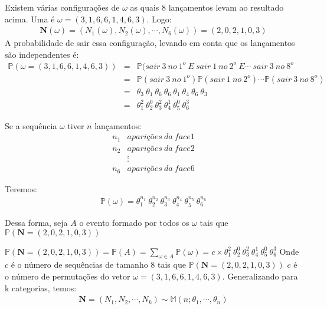 \documentclass[11pt,a4paper]{article}
\begin{document}
		Existem várias configurações de $\omega$ as quais 8 lançamentos levam ao resultado acima.
		Uma é $\omega=(3,1,6,6,1,4,6,3)$.
		Logo:
		\begin{align*}
			\textbf{N}(\omega)=(N_1(\omega),N_2(\omega),\cdots,N_6(\omega))=(2,0,2,1,0,3)
		\end{align*}
		A probabilidade de sair essa configuração, levando em conta que os lançamentos são independentes é:
		\begin{eqnarray*}
			\mathbb{P}(\omega=(3,1,6,6,1,4,6,3))&=&\mathbb{P}(sair~3~no~1^o~E~sair~1~no~2^o~E\cdots~sair~3~no~8^o\\
			& = &\mathbb{P}(sair~3~no~1^o)\mathbb{P}(sair~1~no~2^o)\cdots\mathbb{P}(sair~3~no~8^o)\\
			& = &\theta_3~\theta_1~\theta_6~\theta_6~\theta_1~\theta_4~\theta_6~\theta_3\\
			& = &\theta_{1}^{2}~\theta_{2}^{0}~\theta_{3}^{2}~\theta_{4}^{1}~\theta_{5}^{0}~\theta_{6}^{3}
		\end{eqnarray*}
		
		Se a sequência $\omega$ tiver $n$ lançamentos:
		\begin{eqnarray*}
			n_1 & aparições~da~face 1\\
			n_2 & aparições~da~face 2\\
			&\vdots\\
			n_6 & aparições~da~face 6
		\end{eqnarray*}
		
		Teremos:
		\begin{eqnarray*}
			\mathbb{P}(\omega)=\theta_{1}^{n_1}~\theta_{2}^{n_2}~\theta_{3}^{n_3}~\theta_{4}^{n_4}~\theta_{5}^{n_5}~\theta_{6}^{n_6}
		\end{eqnarray*}
		
		Dessa forma, seja $A$ o evento formado por todos os $\omega$ tais que $\mathbb{P}(\textbf{N}=(2,0,2,1,0,3))$
		
		$\mathbb{P}(\textbf{N}=(2,0,2,1,0,3))=\mathbb{P}(A)=\sum_{\omega\in A}\mathbb{P}(\omega)=c\times\theta_{1}^{2}~\theta_{2}^{0}~\theta_{3}^{2}~\theta_{4}^{1}~\theta_{5}^{0}~\theta_{6}^{3}$
		Onde $c$ é o número de sequências de tamanho 8 tais que $\mathbb{P}(\textbf{N}=(2,0,2,1,0,3))$
		$c$ é o número de permutações do vetor $\omega=(3,1,6,6,1,4,6,3)$.
		Generalizando para k categorias, temos:
		\begin{eqnarray*}
			\textbf{N}=(N_1,N_2,\cdots,N_k)\sim\mathbb{M}(n;\theta_1,\cdots,\theta_n)
		\end{eqnarray*}
		
\end{document}
